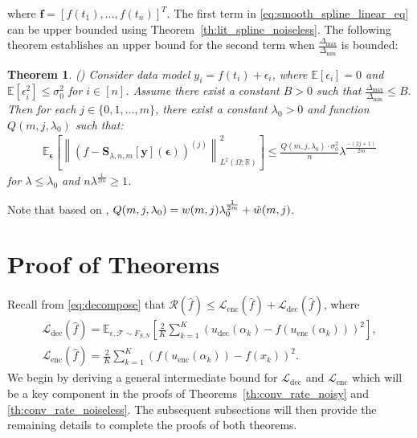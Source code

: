 \documentclass{article}
\newtheorem{theorem}{Theorem}
\def\encs{u_\textrm{enc}}
\def\decs{u_\textrm{dec}}
\def\lenc{\mathcal{L}_\textrm{enc}}
\def\ldec{\mathcal{L}_\textrm{dec}}
\def\stset{\mathcal{F}}
\newcommand{\norm}[1]{\left\lVert#1\right\rVert}
\newcommand{\lp}[1]{{L}^{#1}\left(\Omega; \mathbb{R}\right)}
\newcommand{\spline}{\mathbf{S}_{\lambda,n,m}}
\begin{document}
where $\mathbf{f} = [f(t_1),\dots,f(t_n)]^T$. The first term in \eqref{eq:smooth_spline_linear_eq} can be upper bounded using Theorem~\ref{th:lit_spline_noiseless}. The following theorem establishes an upper bound for the second term when $\frac{\Delta_\textrm{max}}{\Delta_\textrm{min}}$ is bounded:
\begin{theorem} \label{th:lit_spline_noisy} (\citep[Section 5]{utreras1988convergence})
Consider data model $y_i = f(t_i) + \epsilon_i$, where $\mathbb{E}[\epsilon_i] = 0$ and $\mathbb{E}[\epsilon_i^2]\leqslant \sigma_0^2$ for $i\in[n]$. Assume there exist a constant $B>0$ such that $\frac{\Delta_\textrm{max}}{\Delta_\textrm{min}} \leqslant B$. Then for each $j\in \{0,1,\dots,m\}$, there exist a constant $\lambda_0 >0$ and function $Q(m, j,\lambda_0)$ such that:
\begin{align}
\mathbb{E}_{\bm{\epsilon}}\left[\norm{\left(f - \spline[\mathbf{y}](\bm{\epsilon})\right)^{(j)}}_{\lp{2}}^2\right] \leqslant \frac{Q(m,j,\lambda_0)\cdot\sigma_0^2}{n}\lambda^{\frac{-(2j+1)}{2m}}
\end{align}
for $\lambda \leqslant \lambda_0$ and $n \lambda^{\frac{1}{2m}} \geqslant 1$.
\end{theorem}
Note that based on \citep{utreras1988convergence}, $Q(m,j,\lambda_0) = w(m, j)\lambda_0^\frac{1}{2m} + \Tilde{w}(m, j)$. 




\section{Proof of Theorems}\label{app:theorem_proofs}
Recall from \eqref{eq:decompose} that $\mathcal{R}(\hat{f}) \leqslant \lenc(\hat{f}) + \ldec(\hat{f})$, where 
\begin{gather}
    \ldec(\hat{f}) = \mathbb{E}_{\epsilon, \stset \sim F_{S,N}} \left[\frac{2}{K} \sum^K_{k=1} \left(\decs(\alpha_k) - f(\encs(\alpha_k))\right)^2 \right], \label{eq:ldec}\\ \lenc(\hat{f}) = \frac{2}{K} \sum^K_{k=1} \left(f(\encs(\alpha_k)) - f(x_k)\right)^2.
\end{gather}
We begin by deriving a general intermediate bound for $\ldec$ and $\lenc$ which will be a key component in the proofs of Theorems~\ref{th:conv_rate_noisy} and \ref{th:conv_rate_noiseless}. The subsequent subsections will then provide the remaining details to complete the proofs of both theorems.
\end{document}
